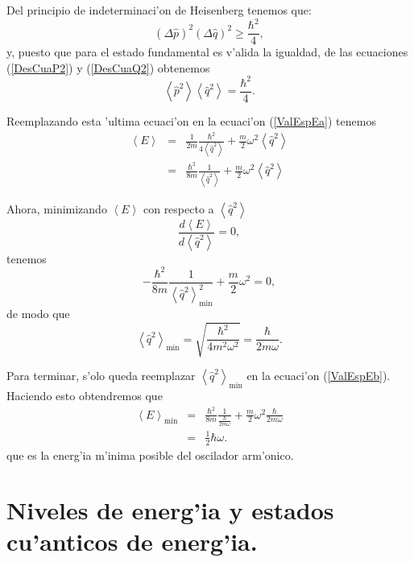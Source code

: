 Del principio de indeterminaci'on de Heisenberg tenemos que:%
\begin{equation}
\left( \Delta\hat{p}\right) ^{2}\left( \Delta\hat{q}\right) ^{2}\geq
\frac{\hbar^{2}}{4},
\end{equation}
y, puesto que para el estado fundamental es v'alida la igualdad, de las
ecuaciones (\ref{DesCuaP2}) y (\ref{DesCuaQ2}) obtenemos%
\begin{equation}
\left\langle \hat{p}^{2}\right> \left\langle \hat{q}^{2}\right>
=\frac{\hbar^{2}}{4}.
\end{equation}

Reemplazando esta 'ultima ecuaci'on en la ecuaci'on (\ref{ValEspEa}) tenemos%
\begin{eqnarray}
\left\langle E\right> & = &\frac{1}{2m}\frac{\hbar^{2}}{4\left\langle
\hat{q}^{2}\right> }+\frac{m}{2}\omega^{2}\left\langle \hat{q}%
^{2}\right> \\
& = &\frac{\hbar^{2}}{8m}\frac{1}{\left\langle \hat{q}^{2}\right> }%
+\frac{m}{2}\omega^{2}\left\langle \hat{q}^{2}\right> \label{ValEspEb}%
\end{eqnarray}

Ahora, minimizando $\left\langle E\right> $ con respecto a $\left\langle
\hat{q}^{2}\right> $
\begin{equation}
\frac{d\left\langle E\right> }{d\left\langle \hat{q}^{2}\right>
}=0,
\end{equation}
tenemos
\begin{equation}
-\frac{\hbar^{2}}{8m}\frac{1}{\left\langle \hat{q}^{2}\right> _{\min
}^{2}}+\frac{m}{2}\omega^{2} =0,
\end{equation}
de modo que
\begin{equation}
\left\langle \hat{q}^{2}\right> _{\min} =\sqrt{\frac{\hbar^{2}%
}{4m^{2}\omega^{2}}} =\frac{\hbar}{2m\omega}.
\end{equation}

Para terminar, s'olo queda reemplazar $\left\langle \hat{q}^{2}%
\right> _{\min}$ en la ecuaci'on (\ref{ValEspEb}). Haciendo esto obtendremos
que
\begin{eqnarray}
\left\langle E\right> _{\min} & = &\frac{\hbar^{2}}{8m}\frac{1}%
{\frac{\hbar}{2m\omega}}+\frac{m}{2}\omega^{2}\frac{\hbar}{2m\omega}\\
& = &\frac{1}{2}\hbar\omega .
\end{eqnarray}
que es la energ'ia m'inima posible del oscilador arm'onico.


\section{Niveles de energ'ia y estados cu'anticos de energ'ia.}

